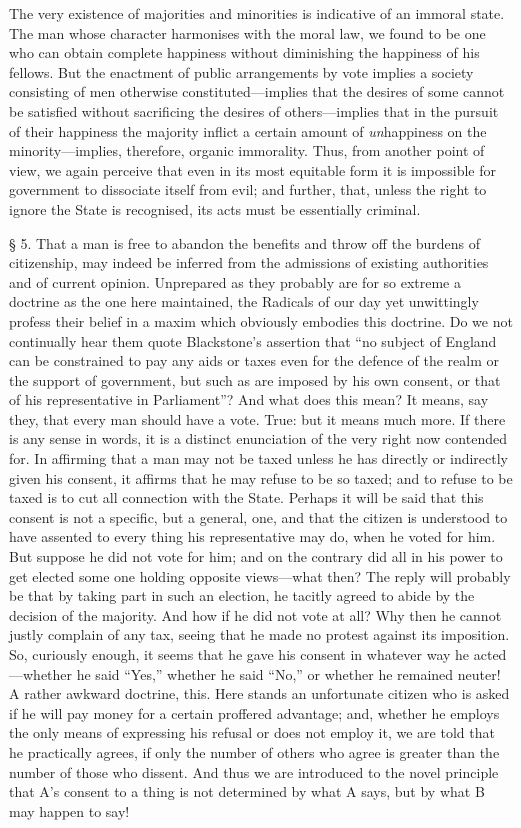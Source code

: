 \documentclass[oneside]{book}
\begin{document}
The very existence of majorities and minorities is indicative
of an immoral state. The man whose character harmonises with
the moral law, we found to be one who can obtain complete
happiness without diminishing the happiness of his fellows. But
the enactment of public arrangements by vote implies a society
consisting of men otherwise constituted---implies that the desires
of some cannot be satisfied without sacrificing the desires of
others---implies that in the pursuit of their happiness the
majority inflict a certain amount of \textit{un}happiness on the minority---implies,
therefore, organic immorality. Thus, from another
point of view, we again perceive that even in its most equitable
form it is impossible for government to dissociate itself from
evil; and further, that, unless the right to ignore the State is
recognised, its acts must be essentially criminal.


\S{} 5. That a man is free to abandon the benefits and throw
off the burdens of citizenship, may indeed be inferred from the
admissions of existing authorities and of current opinion.
\newpage\noindent
Unprepared as they probably are for so extreme a doctrine as the
one here maintained, the Radicals of our day yet unwittingly
profess their belief in a maxim which obviously embodies this
doctrine. Do we not continually hear them quote Blackstone's
assertion that ``no subject of England can be constrained to
pay any aids or taxes even for the defence of the realm or the
support of government, but such as are imposed by his own
consent, or that of his representative in Parliament''? And
what does this mean? It means, say they, that every man
should have a vote. True: but it means much more. If there
is any sense in words, it is a distinct enunciation of the very
right now contended for. In affirming that a man may not be
taxed unless he has directly or indirectly given his consent, it
affirms that he may refuse to be so taxed; and to refuse to be
taxed is to cut all connection with the State. Perhaps it will
be said that this consent is not a specific, but a general, one,
and that the citizen is understood to have assented to every
thing his representative may do, when he voted for him. But
suppose he did not vote for him; and on the contrary did all
in his power to get elected some one holding opposite views---what
then? The reply will probably be that by taking part in
such an election, he tacitly agreed to abide by the decision of
the majority. And how if he did not vote at all? Why then
he cannot justly complain of any tax, seeing that he made no
protest against its imposition. So, curiously enough, it seems
that he gave his consent in whatever way he acted---whether
he said ``Yes,'' whether he said ``No,'' or whether he remained
neuter! A rather awkward doctrine, this. Here stands an
unfortunate citizen who is asked if he will pay money for a
certain proffered advantage; and, whether he employs the only
means of expressing his refusal or does not employ it, we are
told that he practically agrees, if only the number of others
who agree is greater than the number of those who dissent.
And thus we are introduced to the novel principle that A's
consent to a thing is not determined by what A says, but by
what B may happen to say!
\end{document}
